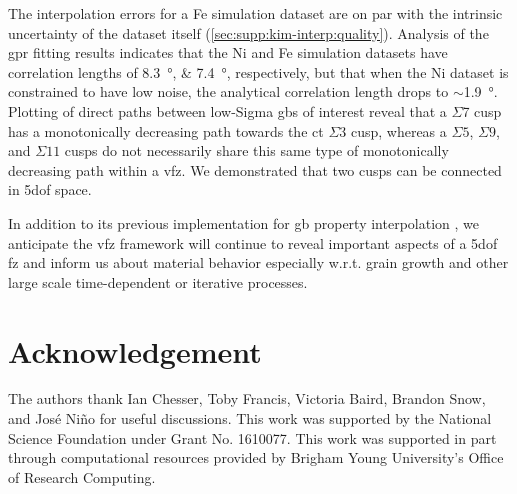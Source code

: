 \documentclass[final,twocolumn,12pt]{elsarticle}
\begin{document}
	The interpolation errors for a Fe simulation dataset are on par with the intrinsic uncertainty of the dataset itself (\cref{sec:supp:kim-interp:quality}). %
	Analysis of the \gls{gpr} fitting results indicates that the Ni and Fe simulation datasets have correlation lengths of \SIlist{8.3;7.4}{\degree}, respectively, but that when the Ni dataset is constrained to have low noise, the analytical correlation length drops to $\sim$\SI{1.9}{\degree}. %
	Plotting of direct paths between low-Sigma \glspl{gb} of interest reveal that a $\Sigma$7 cusp has a monotonically decreasing path towards the \gls{ct} $\Sigma3$ cusp, whereas a $\Sigma5$, $\Sigma9$, and $\Sigma11$ cusps do not necessarily share this same type of monotonically decreasing path within a \gls{vfz}. We demonstrated that two cusps can be connected in \gls{5dof} space.
	
	In addition to its previous implementation for \gls{gb} property interpolation \cite{bairdFiveDegreeofFreedomPropertyUnderReview}, we anticipate the \gls{vfz} framework will continue to reveal important aspects of a \gls{5dof} \gls{fz} and inform us about material behavior especially w.r.t. grain growth and other large scale time-dependent or iterative processes.
	\section*{Acknowledgement}
	\label{sec:acknowledgement}
	
	The authors thank Ian Chesser, Toby Francis, Victoria Baird, Brandon Snow, and José Niño for useful discussions. This work was supported by the National Science Foundation under Grant No. 1610077. This work was supported in part through computational resources provided by Brigham Young University's Office of Research Computing.
\end{document}
